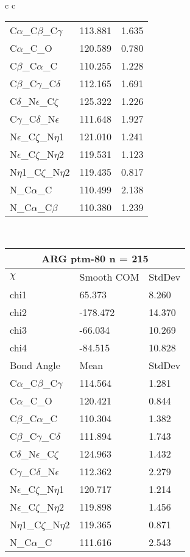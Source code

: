\begin{longtable}{ c c }
\begin{tabular}{ l l l }
  C$\alpha$\_C$\beta$\_C$\gamma$ & 113.881 & 1.635\\
  C$\alpha$\_C\_O & 120.589 & 0.780\\
  C$\beta$\_C$\alpha$\_C & 110.255 & 1.228\\
  C$\beta$\_C$\gamma$\_C$\delta$ & 112.165 & 1.691\\
  C$\delta$\_N$\epsilon$\_C$\zeta$ & 125.322 & 1.226\\
  C$\gamma$\_C$\delta$\_N$\epsilon$ & 111.648 & 1.927\\
  N$\epsilon$\_C$\zeta$\_N$\eta$1 & 121.010 & 1.241\\
  N$\epsilon$\_C$\zeta$\_N$\eta$2 & 119.531 & 1.123\\
  N$\eta$1\_C$\zeta$\_N$\eta$2 & 119.435 & 0.817\\
  N\_C$\alpha$\_C & 110.499 & 2.138\\
  N\_C$\alpha$\_C$\beta$ & 110.380 & 1.239\\
  \bottomrule
  \end{tabular}
  \\
  \begin{tabular}{ l l l }
  \toprule
  \multicolumn{3}{c}{ARG \textbf{ptm-80} n = 215} \\ \toprule
  $\chi$       & Smooth COM & StdDev \\ \midrule
  chi1 & 65.373 & 8.260 \\ 
  chi2 & -178.472 & 14.370 \\ 
  chi3 & -66.034 & 10.269 \\ 
  chi4 & -84.515 & 10.828 \\ \midrule
  Bond Angle   & Mean     & StdDev \\ \midrule
  C$\alpha$\_C$\beta$\_C$\gamma$ & 114.564 & 1.281\\
  C$\alpha$\_C\_O & 120.421 & 0.844\\
  C$\beta$\_C$\alpha$\_C & 110.304 & 1.382\\
  C$\beta$\_C$\gamma$\_C$\delta$ & 111.894 & 1.743\\
  C$\delta$\_N$\epsilon$\_C$\zeta$ & 124.963 & 1.432\\
  C$\gamma$\_C$\delta$\_N$\epsilon$ & 112.362 & 2.279\\
  N$\epsilon$\_C$\zeta$\_N$\eta$1 & 120.717 & 1.214\\
  N$\epsilon$\_C$\zeta$\_N$\eta$2 & 119.898 & 1.456\\
  N$\eta$1\_C$\zeta$\_N$\eta$2 & 119.365 & 0.871\\
  N\_C$\alpha$\_C & 111.616 & 2.543\\

\end{tabular}
\end{longtable}
